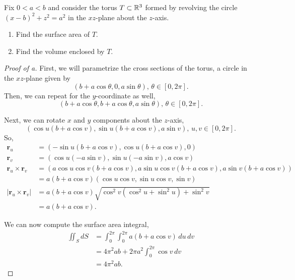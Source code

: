 \documentclass[../hw10]{subfiles}
\begin{document}
\begin{problem}[2]
Fix $0<a<b$ and consider the torus  $T\subset \mathbb{R}^3$ formed by revolving the circle ${(x-b)}^2 + z^2=a^2$ in the $xz$-plane about the  $z$-axis.
\begin{enumerate}[label=(\alph*)]
	\item Find the surface area of $T$.
	\item Find the volume enclosed by $T$.
\end{enumerate}
\end{problem}
\begin{proof}[Proof of a]
	First, we will parametrize the cross sections of the torus, a circle in the $xz$-plane given by  \[
		(b+a\cos{\theta},0,a\sin{\theta}),\, \theta\in [0,2\pi]
		.\]
	Then, we can repeat for the $y$-coordinate as well,
	\[
		(b+a\cos{\theta},b+a\cos{\theta},a\sin{\theta}),\, \theta\in [0,2\pi]
		.\]

	Next, we can rotate $x$ and $y$  components about the $z$-axis, \[
		(\cos{u}(b+a\cos{v}),\sin{u}(b+a\cos{v}),a\sin{v}),\, u,v\in [0,2\pi]
		.\]
	So,
	\begin{align*}
		\mathbf{r}_u                     & = (-\sin{u}(b+a\cos{v}),\cos{u}(b+a\cos{v}),0)                                   \\
		\mathbf{r}_v                     & = (\cos{u}(-a\sin{v}),\sin{u}(-a\sin{v}),a\cos{v})                               \\
		\mathbf{r}_u\times \mathbf{r}_v  & = (a\cos{u}\cos{v}(b+a\cos{v}),a\sin{u}\cos{v}(b+a\cos{v}),a\sin{v}(b+a\cos{v})) \\
		                                 & = a(b+a\cos{v})(\cos{u}\cos{v},\sin{u}\cos{v},\sin{v})                           \\
		|\mathbf{r}_u\times\mathbf{r}_v| & = a(b+a\cos{v})\sqrt{\cos^2{v}(\cos^2{u}+\sin^2{u})+\sin^2{v}}                   \\
		                                 & = a(b+a\cos{v})
		.\end{align*}

	We can now compute the surface area integral,
	\begin{align*}
		\iint_S dS & = \int_{0}^{2\pi} \int_{0}^{2\pi} a(b+a\cos{v})\,du\,dv \\
		           & = 4\pi^2 ab + 2\pi a^2 \int_{0}^{2\pi} \cos{v}\,dv      \\
		           & = 4\pi^2 ab
		.\end{align*}
\end{proof}
\end{document}
